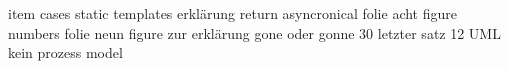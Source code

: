item cases
static templates erklärung
return asyncronical
folie acht figure numbers
folie neun figure zur erklärung
gone oder gonne
30 letzter satz
12 UML kein prozess model
